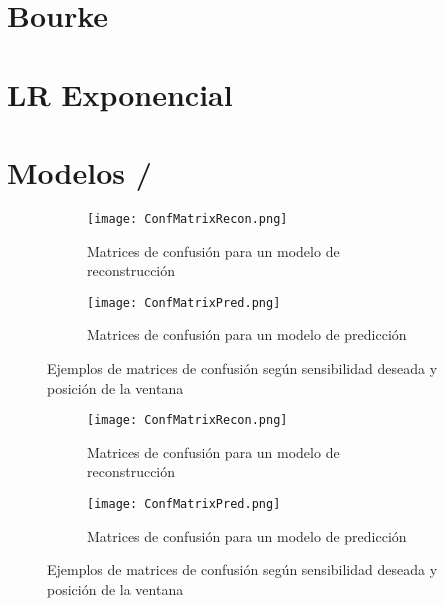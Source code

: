 

\section{Bourke}


\section{LR Exponencial}


\section{Modelos \ifell/}

\begin{sidewaysfigure}[!ht]
  \centering
  \begin{subfigure}[b]{0.45\textwidth}
      \centering
      \texttt{[image: ConfMatrixRecon.png]}
      \caption{\footnotesize \label{fig:ifell:confmat:recon}Matrices de confusión para un modelo de reconstrucción}
  \end{subfigure}
  \hfill
  \begin{subfigure}[b]{0.45\textwidth}
      \centering
      \texttt{[image: ConfMatrixPred.png]}
      \caption{\footnotesize \label{fig:ifell:confmat:pred}Matrices de confusión para un modelo de predicción}
  \end{subfigure}
  \caption{\label{fig:ifell:confmats}Ejemplos de matrices de confusión según sensibilidad deseada y posición de la ventana}
\end{sidewaysfigure}

\begin{sidewaysfigure}[!ht]
  \centering
  \begin{subfigure}[b]{0.45\textwidth}
      \centering
      \texttt{[image: ConfMatrixRecon.png]}
      \caption{\footnotesize \label{fig:ifell:adata:confmat:recon}Matrices de confusión para un modelo de reconstrucción}
  \end{subfigure}
  \hfill
  \begin{subfigure}[b]{0.45\textwidth}
      \centering
      \texttt{[image: ConfMatrixPred.png]}
      \caption{\footnotesize \label{fig:ifell:adata:confmat:pred}Matrices de confusión para un modelo de predicción}
  \end{subfigure}
  \caption{\label{fig:ifell:adata:confmats}Ejemplos de matrices de confusión según sensibilidad deseada y posición de la ventana}
\end{sidewaysfigure}
